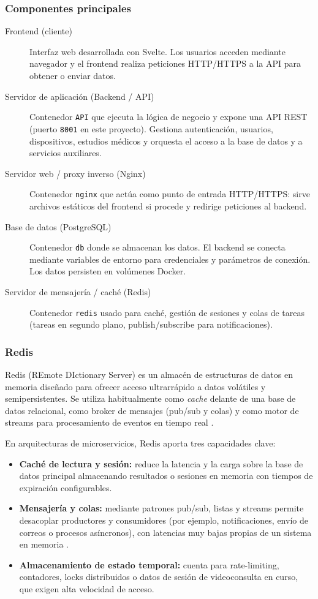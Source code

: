 \documentclass[12pt, a4paper]{article}
\begin{document}
\subsubsection{Componentes principales}
\begin{description}
	\item[Frontend (cliente)] Interfaz web desarrollada con Svelte. Los usuarios acceden mediante navegador y el frontend realiza peticiones HTTP/HTTPS a la API para obtener o enviar datos.
	\item[Servidor de aplicación (Backend / API)] Contenedor \texttt{API} que ejecuta la lógica de negocio y expone una API REST (puerto \texttt{8001} en este proyecto). Gestiona autenticación, usuarios, dispositivos, estudios médicos y orquesta el acceso a la base de datos y a servicios auxiliares.
	\item[Servidor web / proxy inverso (Nginx)] Contenedor \texttt{nginx} que actúa como punto de entrada HTTP/HTTPS: sirve archivos estáticos del frontend si procede y redirige peticiones al backend. 
	\item[Base de datos (PostgreSQL)] Contenedor \texttt{db} donde se almacenan los datos. El backend se conecta mediante variables de entorno para credenciales y parámetros de conexión. Los datos persisten en volúmenes Docker.
	\item[Servidor de mensajería / caché (Redis)] Contenedor \texttt{redis} usado para caché, gestión de sesiones y colas de tareas (tareas en segundo plano, publish/subscribe para notificaciones).

\end{description}



\subsubsection{Redis}
Redis (REmote DIctionary Server) es un almacén de estructuras de datos en memoria diseñado para ofrecer acceso ultrarrápido a datos volátiles y semipersistentes. Se utiliza habitualmente como \emph{cache} delante de una base de datos relacional, como broker de mensajes (pub/sub y colas) y como motor de streams para procesamiento de eventos en tiempo real \cite{redis_persistence}.

En arquitecturas de microservicios, Redis aporta tres capacidades clave:
\begin{itemize}
	\item \textbf{Caché de lectura y sesión:} reduce la latencia y la carga sobre la base de datos principal almacenando resultados o sesiones en memoria con tiempos de expiración configurables.
	\item \textbf{Mensajería y colas:} mediante patrones pub/sub, listas y streams permite desacoplar productores y consumidores (por ejemplo, notificaciones, envío de correos o procesos asíncronos), con latencias muy bajas propias de un sistema en memoria \cite{redis_pubsub,redis_streams}.
	\item \textbf{Almacenamiento de estado temporal:} cuenta para rate-limiting, contadores, locks distribuidos o datos de sesión de videoconsulta en curso, que exigen alta velocidad de acceso.
\end{itemize}
\end{document}
